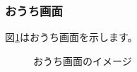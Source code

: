 \documentclass[a4j]{jarticle}
\begin{document}
\newpage
\subsubsection{おうち画面}
図\ref{myhome}はおうち画面を示します。\\


\begin{figure}[H]
 \begin{minipage}{0.5\hsize}
   \begin{center}
   \caption{おうち画面のイメージ}
   \label{myhome}
  \end{center}
 \end{minipage}
 \begin{minipage}{0.5\hsize}
  \begin{center}

\end{center}
\end{minipage}
\end{figure}
\end{document}
